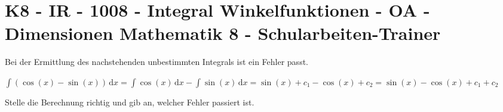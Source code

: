 \section{K8 - IR - 1008 - Integral Winkelfunktionen - OA - Dimensionen Mathematik 8 - Schularbeiten-Trainer}

\begin{beispiel}[K8 - IR]{1}
Bei der Ermittlung des nachstehenden unbestimmten Integrals ist ein Fehler passt.

$\int{(\cos(x)-\sin(x))}\,\text{d}x=\int{\cos(x)}\,\text{d}x-\int{\sin(x)}\,\text{d}x=\sin(x)+c_1-\cos(x)+c_2=\sin(x)-\cos(x)+c_1+c_2$

Stelle die Berechnung richtig und gib an, welcher Fehler passiert ist.

\end{beispiel}